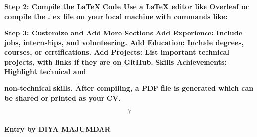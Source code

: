 \documentclass{article} %
\begin{document}
\noindent \textbf{}

\noindent \textbf{}

\noindent \textbf{}

\noindent \textbf{}

\noindent \textbf{}

\noindent \textbf{Step 2: Compile the LaTeX Code Use a LaTeX editor like Overleaf or compile the .tex file on your local machine with commands like:}

\noindent \textbf{}

\noindent \textbf{}

\noindent 

\noindent 

\noindent 

\noindent 

\noindent 

\noindent 

\noindent 

\noindent 

\noindent 

\noindent 

\noindent \textbf{Step 3: Customize and Add More Sections Add Experience: Include jobs, internships, and volunteering. Add Education: Include degrees, courses, or certifications. Add Projects: List important technical projects, with links if they are on GitHub. Skills Achievements: Highlight technical and}

\noindent \textbf{non-technical skills. After compiling, a PDF file is generated which can be shared or printed as your CV.}

\noindent 

\noindent 

\noindent 

\noindent 

\noindent 

\noindent 

\noindent 

\noindent 
\[7\] 


\noindent \textbf{}

\noindent \textbf{}

\noindent \textbf{}

\noindent \textbf{}

\noindent \textbf{}

\noindent 
\paragraph{Entry by DIYA MAJUMDAR}
\end{document}
